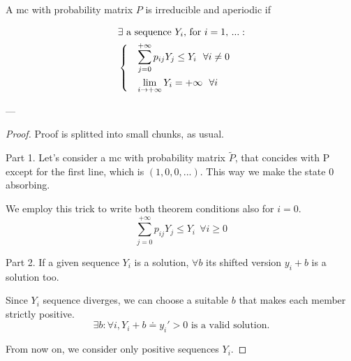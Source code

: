	\begin{theorem}[4.2, KT p. 95]
		A \gls{mc} with probability matrix $P$ is irreducible and aperiodic if

		\begin{equation}\begin{split}
			& \exists \text{ a sequence } Y_i \text{, for } i = 1,\,... :\\
			& \begin{dcases}
 				& \sum_{j=0}^{+\infty} p_{ij} Y_j \le Y_i 	~~ \forall i \neq 0 \\
 				& \lim_{i \to +\infty} Y_i = +\infty		~~ \forall i
			\end{dcases}
		\end{split}\end{equation}
	\end{theorem}
	---
	\begin{proof}
		Proof is splitted into small chunks, as usual.

		Part 1.
		Let's consider a \gls{mc} with probability matrix $\tilde{P}$, that concides with P except for the first line, which is $(1, 0, 0, ...)$.
		This way we make the state 0 absorbing.

		We employ this trick to write both theorem conditions also for $i=0$.
		$$ \sum_{j=0}^{+\infty} p_{ij} Y_j \le Y_i ~~ \forall i \ge 0 $$

		Part 2.
		If a given sequence $Y_i$ is a solution, $\forall b$ its shifted version $y_i + b$ is a solution too.

		Since $Y_i$ sequence diverges, we can choose a suitable $b$ that makes each member strictly positive.
		\begin{equation}
			\exists b: \forall i, Y_i + b \doteq y_i' > 0 \text{ is a valid solution.}
		\end{equation}

		From now on, we consider only positive sequences $Y_i$.


\end{proof}
